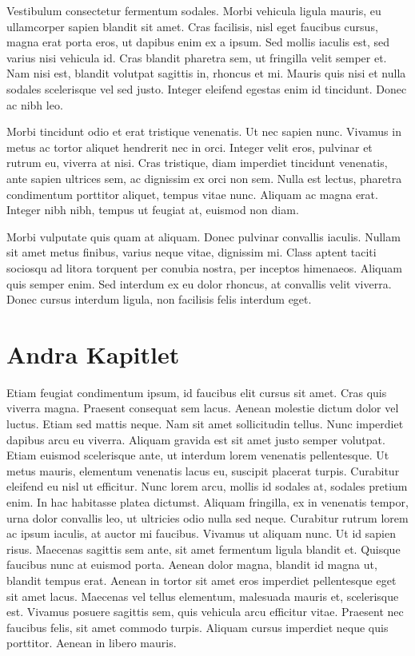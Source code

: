 \documentclass[a4paper,10pt]{article}
\begin{document}
Vestibulum consectetur fermentum sodales. Morbi vehicula ligula mauris, eu ullamcorper sapien blandit sit amet. Cras facilisis, nisl eget faucibus cursus, magna erat porta eros, ut dapibus enim ex a ipsum. Sed mollis iaculis est, sed varius nisi vehicula id. Cras blandit pharetra sem, ut fringilla velit semper et. Nam nisi est, blandit volutpat sagittis in, rhoncus et mi. Mauris quis nisi et nulla sodales scelerisque vel sed justo. Integer eleifend egestas enim id tincidunt. Donec ac nibh leo.

Morbi tincidunt odio et erat tristique venenatis. Ut nec sapien nunc. Vivamus in metus ac tortor aliquet hendrerit nec in orci. Integer velit eros, pulvinar et rutrum eu, viverra at nisi. Cras tristique, diam imperdiet tincidunt venenatis, ante sapien ultrices sem, ac dignissim ex orci non sem. Nulla est lectus, pharetra condimentum porttitor aliquet, tempus vitae nunc. Aliquam ac magna erat. Integer nibh nibh, tempus ut feugiat at, euismod non diam.

Morbi vulputate quis quam at aliquam. Donec pulvinar convallis iaculis. Nullam sit amet metus finibus, varius neque vitae, dignissim mi. Class aptent taciti sociosqu ad litora torquent per conubia nostra, per inceptos himenaeos. Aliquam quis semper enim. Sed interdum ex eu dolor rhoncus, at convallis velit viverra. Donec cursus interdum ligula, non facilisis felis interdum eget.
\section{Andra Kapitlet}
Etiam feugiat condimentum ipsum, id faucibus elit cursus sit amet. Cras quis viverra magna. Praesent consequat sem lacus. Aenean molestie dictum dolor vel luctus. Etiam sed mattis neque. Nam sit amet sollicitudin tellus. Nunc imperdiet dapibus arcu eu viverra. Aliquam gravida est sit amet justo semper volutpat. Etiam euismod scelerisque ante, ut interdum lorem venenatis pellentesque. Ut metus mauris, elementum venenatis lacus eu, suscipit placerat turpis. Curabitur eleifend eu nisl ut efficitur. Nunc lorem arcu, mollis id sodales at, sodales pretium enim. In hac habitasse platea dictumst. Aliquam fringilla, ex in venenatis tempor, urna dolor convallis leo, ut ultricies odio nulla sed neque. Curabitur rutrum lorem ac ipsum iaculis, at auctor mi faucibus.
Vivamus ut aliquam nunc. Ut id sapien risus. Maecenas sagittis sem ante, sit amet fermentum ligula blandit et. Quisque faucibus nunc at euismod porta. Aenean dolor magna, blandit id magna ut, blandit tempus erat. Aenean in tortor sit amet eros imperdiet pellentesque eget sit amet lacus. Maecenas vel tellus elementum, malesuada mauris et, scelerisque est. Vivamus posuere sagittis sem, quis vehicula arcu efficitur vitae. Praesent nec faucibus felis, sit amet commodo turpis. Aliquam cursus imperdiet neque quis porttitor. Aenean in libero mauris.
\end{document}
